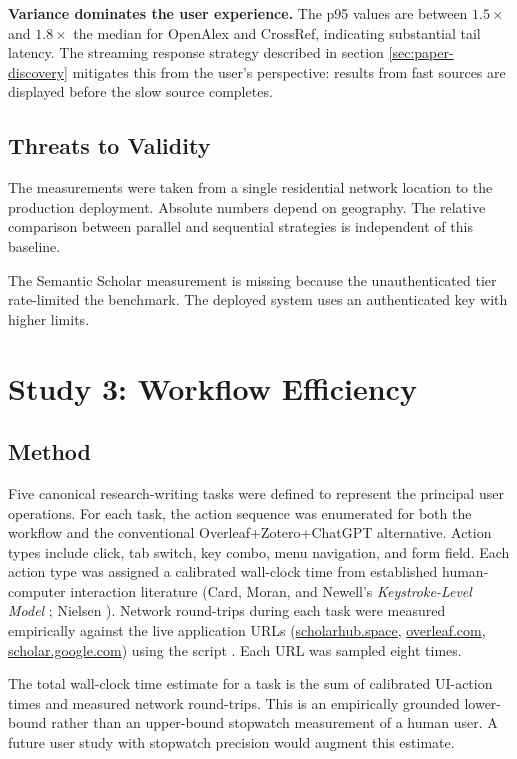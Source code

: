 \textbf{Variance dominates the user experience.} The p95 values are between $1.5\times$ and $1.8\times$ the median for OpenAlex and CrossRef, indicating substantial tail latency. The streaming response strategy described in section \ref{sec:paper-discovery} mitigates this from the user's perspective: results from fast sources are displayed before the slow source completes.

\subsection{Threats to Validity}

The measurements were taken from a single residential network location to the production deployment. Absolute numbers depend on geography. The relative comparison between parallel and sequential strategies is independent of this baseline.

The Semantic Scholar measurement is missing because the unauthenticated tier rate-limited the benchmark. The deployed system uses an authenticated key with higher limits.

\section{Study 3: Workflow Efficiency}
\label{sec:eval-study3}

\subsection{Method}

Five canonical research-writing tasks were defined to represent the principal user operations. For each task, the action sequence was enumerated for both the \sh{} workflow and the conventional Overleaf+Zotero+ChatGPT alternative. Action types include click, tab switch, key combo, menu navigation, and form field. Each action type was assigned a calibrated wall-clock time from established human-computer interaction literature (Card, Moran, and Newell's \textit{Keystroke-Level Model} \cite{card1983psychology}; Nielsen \cite{nielsen1994usability}). Network round-trips during each task were measured empirically against the live application URLs (\url{scholarhub.space}, \url{overleaf.com}, \url{scholar.google.com}) using the script . Each URL was sampled eight times.

The total wall-clock time estimate for a task is the sum of calibrated UI-action times and measured network round-trips. This is an empirically grounded lower-bound rather than an upper-bound stopwatch measurement of a human user. A future user study with stopwatch precision would augment this estimate.

